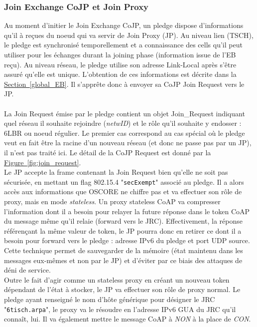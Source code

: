 \documentclass[]{report}
\newcommand{\minit}[1]{\noindent{\small\textbf{ \underline{#1}}}~\\}
\newcommand{\wordlink}[2]{\hyperref[#2]{#1~\ref{#2}}}
\begin{document}
\newpage

\subsubsection{Join Exchange CoJP et Join Proxy}

Au moment d'initier le Join Exchange CoJP, un pledge dispose d'informations qu'il à reçues du noeud qui va servir de Join Proxy (JP). Au niveau lien (TSCH), le pledge est synchronisé temporellement et a connaissance des cells qu'il peut utiliser pour les échanges durant la joining phase (information issue de l'EB reçu). Au niveau réseau, le pledge utilise son adresse Link-Local après s'être assuré qu'elle est unique. L'obtention de ces informations est décrite dans la \wordlink{Section}{global_EB}. Il s'apprête donc à envoyer sa CoJP Join Request vers le JP.\\

\minit{pledge $\rightarrow$ JP}

La Join Request émise par le pledge contient un objet Join\_Request indiquant quel réseau il souhaite rejoindre (\textit{netwID}) et le rôle qu'il souhaite y endosser : 6LBR ou noeud régulier. Le premier cas correspond au cas spécial où le pledge veut en fait être la racine d'un nouveau réseau (et donc ne passe pas par un JP), il n'est pas traité ici. Le détail de la CoJP Request est donné par la \wordlink{Figure}{fig:join_request}.\\

 Le JP accepte la frame contenant la Join Request bien qu'elle ne soit pas sécurisée, en mettant un flag 802.15.4 "\texttt{secExempt}" associé au pledge. Il a alors accès aux informations que OSCORE ne chiffre pas et va effectuer son rôle de proxy, mais en mode \textit{stateless}. Un proxy stateless CoAP va compresser l'information dont il a besoin pour relayer la future réponse dans le token CoAP du message même qu'il relaie (forward vers le JRC). Effectivement, la réponse référençant la même valeur de token, le JP pourra donc en retirer ce dont il a besoin pour forward vers le pledge : adresse IPv6 du pledge et port UDP source. Cette technique permet de sauvegarder de la mémoire (état maintenu dans les messages eux-mêmes et non par le JP) et d'éviter par ce biais des attaques de déni de service.\\
 
 Outre le fait d'agir comme un stateless proxy en créant un nouveau token dépendant de l'état à stocker, le JP va effectuer son rôle de proxy normal. Le pledge ayant renseigné le nom d'hôte générique pour désigner le JRC "\texttt{6tisch.arpa}", le proxy va le résoudre en l'adresse IPv6 GUA du JRC qu'il connaît, lui. Il va également mettre le message CoAP à \textit{NON} à la place de \textit{CON}.\\
\end{document}
